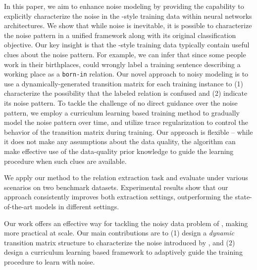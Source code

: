 In this paper, we aim to enhance \DS noise modeling by providing the capability to explicitly characterize 
the noise in the \DS-style training data within neural networks architectures.  We show that while noise is inevitable, it is possible to characterize the noise pattern  in a unified framework along with its original classification objective. Our key insight is that the \DS-style training  data typically contain useful clues about the noise pattern. For example, we can infer that since some people work in their birthplaces, \DS could wrongly label a training sentence describing a working place as a \texttt{born-in} relation.
Our novel approach to noisy modeling is to use a dynamically-generated transition matrix for each training instance to (1) characterize the possibility that the \DS labeled relation is confused and (2) indicate its noise pattern.  To tackle the challenge of no direct guidance over the noise pattern, we employ a curriculum learning based training method to gradually model the noise pattern over time, and utilize trace regularization to control the behavior of the transition matrix during training. Our approach is flexible -- while it does not make any assumptions about the data quality, the algorithm can make effective use
of the data-quality prior knowledge to guide the learning procedure when such clues are available. 

We apply our method to the relation extraction task and evaluate under various scenarios on two benchmark datasets. Experimental results show that our approach consistently improves both extraction settings, outperforming the state-of-the-art models in different settings. 

Our work offers an effective way for tackling the noisy data problem of \DS, making \DS more practical at scale. Our main contributions are to (1) design a \emph{dynamic} transition matrix structure to characterize the noise introduced by \DS, and (2) design a curriculum learning based framework to adaptively guide the training procedure to learn with noise.


